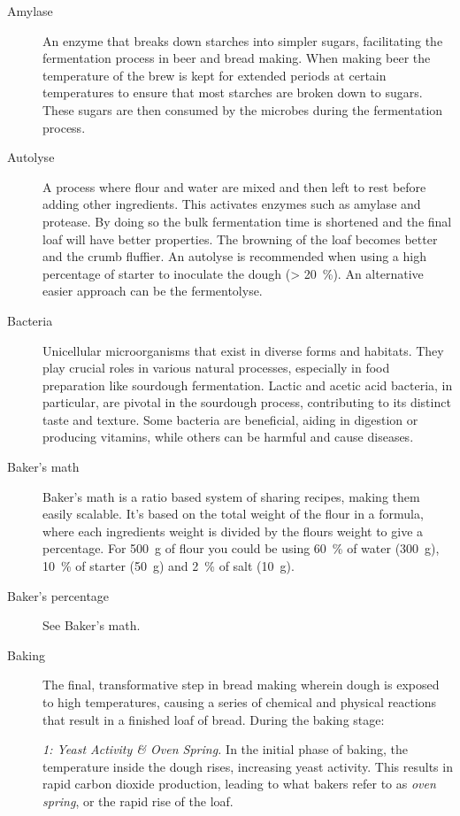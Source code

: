 \begin{description}
\item[Amylase] An enzyme that breaks down starches into simpler sugars, facilitating
the fermentation process in beer and bread making. When making beer the temperature
of the brew is kept for extended periods at certain temperatures to ensure that most
starches are broken down to sugars. These sugars are then consumed by the microbes
during the fermentation process.

\item[Autolyse] A process where flour and water are mixed and then left to rest
before adding other ingredients. This activates enzymes such as amylase and protease.
By doing so the bulk fermentation time is shortened and the final loaf will have
better properties. The browning of the loaf becomes better and the crumb fluffier.
An autolyse is recommended when using a high percentage of starter to inoculate the
dough (> \SI{20}{\percent}). An alternative easier approach can be the fermentolyse.

\item[Bacteria] Unicellular microorganisms that exist in diverse forms and
habitats. They play crucial roles in various natural processes, especially in food
preparation like sourdough fermentation. Lactic and acetic acid bacteria, in particular,
are pivotal in the sourdough process, contributing to its distinct taste and texture.
Some bacteria are beneficial, aiding in digestion or producing vitamins, while others
can be harmful and cause diseases.

\item[Baker’s math] Baker’s math is a ratio based system of sharing recipes,
making them easily scalable. It’s based on the total weight of the flour in a formula,
where each ingredients weight is divided by the flours weight to give a percentage.
For \SI{500}{\gram} of flour you could be using \SI{60}{\percent} of water (\SI{300}{\gram}),
\SI{10}{\percent} of starter (\SI{50}{\gram}) and \SI{2}{\percent} of salt (\SI{10}{\gram}).

\item[Baker’s percentage] See Baker’s math.

\item[Baking] The final, transformative step in bread making wherein dough is
exposed to high temperatures, causing a series of chemical and physical reactions
that result in a finished loaf of bread. During the baking stage:

\emph{1: Yeast Activity \& Oven Spring.} In the initial phase of baking, the
temperature inside the dough rises, increasing yeast activity. This results in rapid
carbon dioxide production, leading to what bakers refer to as \emph{oven spring}, or the
rapid rise of the loaf.


\end{description}
